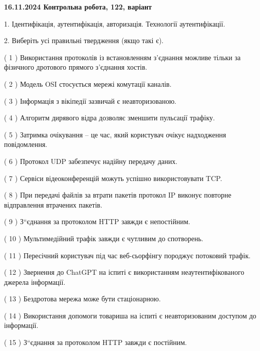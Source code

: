 \documentclass[12pt, ukrainian]{article}
\begin{document}
\vspace{4mm}
\newpage
\begin {large}

\textbf{16.11.2024 Контрольна робота, 122, варіант  }\par


{
1. Ідентифікація, аутентифікація, авторизація. Технології аутентифікації.



\vspace{5mm}
2. Виберіть усі правильні твердження (якщо такі є).\par
\vspace{2mm}

( 1 ) Використання протоколів із встановленням з'єднання можливе тільки за фізичного дротового прямого з'єднання хостів.

( 2 ) Модель OSI стосується мережі комутації каналів.

( 3 ) Інформація з вікіпедії зазвичай є неавторизованою.

( 4 ) Алгоритм дирявого відра дозволяє зменшити пульсації трафіку.

( 5 ) Затримка очікування – це час, який користувач очікує надходження повідомлення.

( 6 ) Протокол UDP забезпечує надійну передачу даних.

( 7 ) Сервіси відеоконференцій можуть успішно використовувати TCP.

( 8 ) При передачі файлів за втрати пакетів протокол IP виконує повторне відправлення втрачених пакетів.

( 9 ) З“єднання за протоколом  HTTP завжди є непостійним.

( 10 ) Мультимедійний трафік завжди є чутливим до спотворень.

( 11 ) Пересічний користувач під час веб-сьорфінгу породжує потоковий трафік.

( 12 ) Звернення до ChatGPT на іспиті є використанням неаутентифікованого джерела інформації.

( 13 ) Бездротова мережа може бути стаціонарною.

( 14 ) Використання допомоги товариша на іспиті є неавторизованим доступом до інформації.

( 15 ) З“єднання за протоколом  HTTP завжди є постійним.
}
\end {large}
\end{document}
